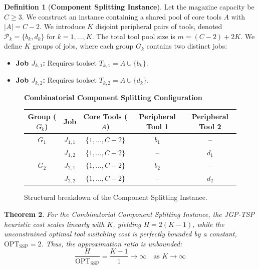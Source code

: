 \documentclass[11pt,a4paper]{article}
\theoremstyle{plain}
\newtheorem{theorem}{Theorem}[section]
\theoremstyle{definition}
\newtheorem{definition}[theorem]{Definition}
\newcommand{\OPT}{\text{OPT}}
\newcommand{\SSP}{\text{SSP}}
\begin{document}
\begin{definition}[\textbf{Component Splitting Instance}]
	Let the magazine capacity be $C \ge 3$. We construct an instance containing a shared pool of core tools $A$ with $|A| = C - 2$. We introduce $K$ disjoint peripheral pairs of tools, denoted $\mathcal{P}_k = \{b_k, d_k\}$ for $k = 1, \dots, K$. The total tool pool size is $m = (C-2) + 2K$.
	We define $K$ groups of jobs, where each group $G_k$ contains two distinct jobs:
	\begin{itemize}
		\item \textbf{Job $J_{k,1}$:} Requires toolset $T_{k,1} = A \cup \{b_k\}$.
		\item \textbf{Job $J_{k,2}$:} Requires toolset $T_{k,2} = A \cup \{d_k\}$.
	\end{itemize}
\end{definition}

\begin{figure}[ht]
	\centering
	\begin{mdframed}[backgroundcolor=proofgray,linecolor=navyblue,linewidth=0.5pt]
		\centering
		\textbf{Combinatorial Component Splitting Configuration}
		\vskip 0.2cm
		\begin{tabular}{ccccc}
			\toprule
			\textbf{Group ($G_k$)} & \textbf{Job} & \textbf{Core Tools ($A$)} & \textbf{Peripheral Tool 1} & \textbf{Peripheral Tool 2} \\
			\midrule
			$G_1$ & $J_{1,1}$ & $\{1, \dots, C-2\}$ & $b_1$ & -- \\
			& $J_{1,2}$ & $\{1, \dots, C-2\}$ & -- & $d_1$ \\
			\midrule
			$G_2$ & $J_{2,1}$ & $\{1, \dots, C-2\}$ & $b_2$ & -- \\
			& $J_{2,2}$ & $\{1, \dots, C-2\}$ & -- & $d_2$ \\
			\bottomrule
		\end{tabular}
	\end{mdframed}
	\caption{Structural breakdown of the Component Splitting Instance.}
\end{figure}

\begin{theorem}
	For the Combinatorial Component Splitting Instance, the JGP-TSP heuristic cost scales linearly with $K$, yielding $H = 2(K-1)$, while the unconstrained optimal tool switching cost is perfectly bounded by a constant, $\OPT_{\SSP} = 2$. Thus, the approximation ratio is unbounded:
	\begin{equation}
		\frac{H}{\OPT_{\SSP}} = \frac{K-1}{1} \to \infty \quad \text{as } K \to \infty
	\end{equation}
\end{theorem}
\end{document}
